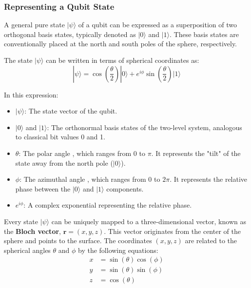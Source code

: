 \documentclass{article}
\begin{document}
  
 \subsubsection*{Representing a Qubit State}
 
 A general pure state $|\psi\rangle$ of a qubit can be expressed as a superposition of two orthogonal basis states, typically denoted as $|0\rangle$ and $|1\rangle$. These basis states are conventionally placed at the north and south poles of the sphere, respectively.
 
 The state $|\psi\rangle$ can be written in terms of spherical coordinates as:
 $$|\psi\rangle = \cos\left(\frac{\theta}{2}\right)|0\rangle + e^{i\phi}\sin\left(\frac{\theta}{2}\right)|1\rangle$$
 
 In this expression:
 \begin{itemize}
 	\item $|\psi\rangle$: The state vector of the qubit.
 	\item $|0\rangle$ and $|1\rangle$: The orthonormal basis states of the two-level system, analogous to classical bit values 0 and 1.
 	\item $\theta$: The   polar angle  , which ranges from $0$ to $\pi$. It represents the "tilt" of the state away from the north pole ($|0\rangle$).
 	\item $\phi$: The   azimuthal angle  , which ranges from $0$ to $2\pi$. It represents the relative phase between the $|0\rangle$ and $|1\rangle$ components.
 	\item $e^{i\phi}$: A complex exponential representing the relative phase.
 \end{itemize}
 
 
 Every state $|\psi\rangle$ can be uniquely mapped to a three-dimensional vector, known as the \textbf{Bloch vector}, $\mathbf{r} = (x, y, z)$. This vector originates from the center of the sphere and points to the surface. The coordinates $(x, y, z)$ are related to the spherical angles $\theta$ and $\phi$ by the following equations:
 \begin{align*}
 x &= \sin(\theta)\cos(\phi) \\
 y &= \sin(\theta)\sin(\phi) \\
 z &= \cos(\theta)
 \end{align*}
 
\end{document}
